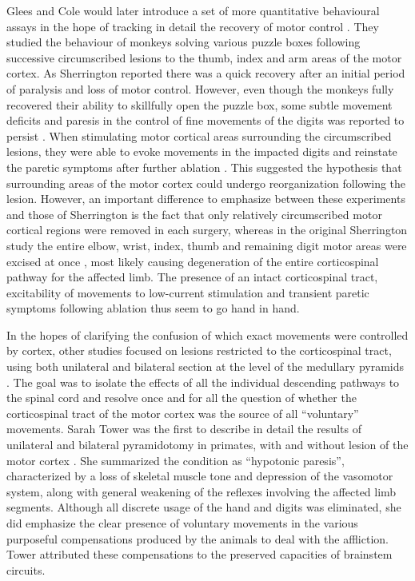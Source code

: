 Glees and Cole would later introduce a set of more quantitative behavioural assays in the hope of tracking in detail the recovery of motor control \cite{Glees1950,Cole1952}. They studied the behaviour of monkeys solving various puzzle boxes following successive circumscribed lesions to the thumb, index and arm areas of the motor cortex. As Sherrington reported there was a quick recovery after an initial period of paralysis and loss of motor control. However, even though the monkeys fully recovered their ability to skillfully open the puzzle box, some subtle movement deficits and paresis in the control of fine movements of the digits was reported to persist \cite{Glees1950}. When stimulating motor cortical areas surrounding the circumscribed lesions, they were able to evoke movements in the impacted digits and reinstate the paretic symptoms after further ablation \cite{Glees1950}. This suggested the hypothesis that surrounding areas of the motor cortex could undergo reorganization following the lesion. However, an important difference to emphasize between these experiments and those of Sherrington is the fact that only relatively circumscribed motor cortical regions were removed in each surgery, whereas in the original Sherrington study the entire elbow, wrist, index, thumb and remaining digit motor areas were excised at once \cite{Leyton1917}, most likely causing degeneration of the entire corticospinal pathway for the affected limb. The presence of an intact corticospinal tract, excitability of movements to low-current stimulation and transient paretic symptoms following ablation thus seem to go hand in hand.

In the hopes of clarifying the confusion of which exact movements were controlled by cortex, other studies focused on lesions restricted to the corticospinal tract, using both unilateral and bilateral section at the level of the medullary pyramids \cite{Tower1940,Lawrence1968,Lawrence1968a}. The goal was to isolate the effects of all the individual descending pathways to the spinal cord and resolve once and for all the question of whether the corticospinal tract of the motor cortex was the source of all ``voluntary'' movements. Sarah Tower was the first to describe in detail the results of unilateral and bilateral pyramidotomy in primates, with and without lesion of the motor cortex \cite{Tower1940}. She summarized the condition as ``hypotonic paresis'', characterized by a loss of skeletal muscle tone and depression of the vasomotor system, along with general weakening of the reflexes involving the affected limb segments. Although all discrete usage of the hand and digits was eliminated, she did emphasize the clear presence of voluntary movements in the various purposeful compensations produced by the animals to deal with the affliction. Tower attributed these compensations to the preserved capacities of brainstem circuits.

